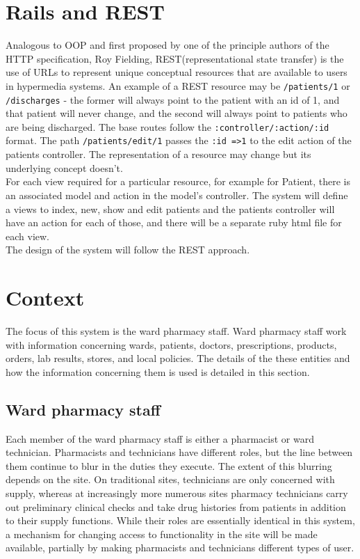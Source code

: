 \documentclass[letterpaper]{amsart}
\begin{document}
\section{Rails and REST}
Analogous to OOP and first proposed by one of the principle authors of the HTTP specification, Roy Fielding\cite{refac}, REST(representational state transfer) is the use of URLs to represent unique conceptual resources that are available to users in hypermedia systems.    An example of a REST resource may be \texttt{/patients/1} or \texttt{/discharges} - the former will always point to the patient with an id of 1, and that patient will never change, and the second will always point to patients who are being discharged.  The base routes follow the \texttt{:controller/:action/:id} format. The path \texttt{/patients/edit/1} passes the \texttt{:id =>1} to the edit action of the patients controller.  The representation of a resource may change but its underlying concept doesn't. \\
For each view required for a particular resource, for example for Patient, there is an associated model and action in the model's controller.  The system will define a views to index, new, show and edit patients and the patients controller will have an action for each of those, and there will be a separate ruby html file for each view.\\
The design of the system will follow the REST approach.
\section{Context} 
The focus of this system is the ward pharmacy staff.  Ward pharmacy staff work with information concerning wards, patients, doctors, prescriptions, products, orders, lab results, stores, and local policies.  The details of the these entities and how the information concerning them is used is detailed in this section.
\subsection{Ward pharmacy staff}
Each member of the ward pharmacy staff is either a pharmacist or ward technician.  Pharmacists and technicians have different roles, but the line between them continue to blur in the duties they execute.  The extent of this blurring depends on the site.  On traditional sites, technicians are only concerned with supply, whereas at increasingly more numerous sites pharmacy technicians carry out preliminary clinical checks and take drug histories from patients in addition to their supply functions.
While their roles are essentially identical in this system, a mechanism for changing access to functionality in the site will be made available, partially by making pharmacists and technicians different types of user.
\end{document}
